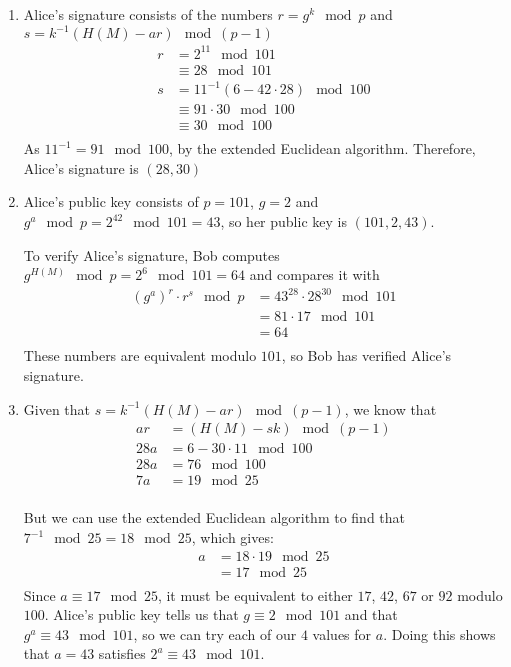 \begin{enumerate}
\item Alice's signature consists of the numbers $r = g^k\mod p$ and
  $s = k^{-1}(H(M) - ar)\mod (p-1)$
  \begin{align*}
    r &= 2^{11} \mod 101 \\
      &\equiv 28 \mod 101 \\
    s &= 11^{-1}(6 - 42 \cdot 28)\mod 100 \\
      &\equiv 91 \cdot 30\mod 100 \\
      &\equiv 30 \mod 100\\
  \end{align*}
  As $11^{-1} = 91\mod 100$, by the extended Euclidean algorithm. Therefore, Alice's signature is $(28, 30)$

\item Alice's public key consists of $p = 101$, $g = 2$ and $g^a \mod p = 2^{42}
  \mod 101 = 43$, so her public key is $(101, 2, 43)$.

  To verify Alice's signature, Bob computes $g^{H(M)} \mod p = 2^6 \mod 101 = 64$
  and compares it with
  \begin{align*}
    (g^a)^r \cdot r^s \mod p &= 43^{28} \cdot 28^{30} \mod 101 \\
                             &= 81 \cdot 17 \mod 101 \\
                             &= 64 \\
  \end{align*}
  These numbers are equivalent modulo $101$, so Bob has verified Alice's signature.

\item Given that $s = k^{-1}(H(M) - ar)\mod (p-1)$, we know that
  \begin{align*}
    ar &= (H(M) - sk) \mod (p-1) \\
    28a &= 6 - 30 \cdot 11 \mod 100 \\
    28a &= 76 \mod 100 \\
    7a &= 19 \mod 25 \\
  \end{align*}

  But we can use the extended Euclidean algorithm to find that $7^{-1} \mod 25
  = 18 \mod 25$, which gives:
  \begin{align*}
    a &= 18 \cdot 19 \mod 25 \\
      &= 17 \mod 25 \\
  \end{align*}
  Since $a \equiv 17 \mod 25$, it must be equivalent to either $17$, $42$, $67$ or
  $92$ modulo $100$. Alice's public key tells us that $g \equiv 2 \mod 101$ and
  that $g^a \equiv 43 \mod 101$, so we can try each of our $4$ values for $a$.
  Doing this shows that $a = 43$ satisfies $2^a \equiv 43 \mod 101$.

\end{enumerate}
